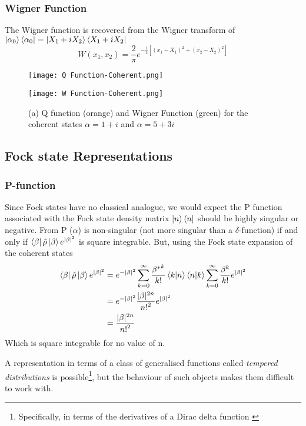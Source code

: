 \subsubsection{Wigner Function}
The Wigner function is recovered from the Wigner transform of $\ket{\alpha_0}\bra{\alpha_0} = \ket{X_1+iX_2}\bra{X_1+iX_2}$
\begin{equation}
	W(x_1, x_2) = \frac{2}{\pi} e^{-\frac{1}{2}[{(x_1-X_1)}^2+{(x_2-X_2)}^2]}
\end{equation}
\begin{figure}[!htb]
  \begin{minipage}{0.5\linewidth}
          \texttt{[image: Q Function-Coherent.png]}
	\end{minipage}%
  \begin{minipage}{0.5\linewidth}
          \texttt{[image: W Function-Coherent.png]}
    \end{minipage}
  \caption{(a) Q function (orange) and Wigner Function (green) for the coherent states $\alpha = 1+i$ and $\alpha = 5+3i$}
\end{figure}
\subsection{Fock state Representations}
\subsubsection{P-function}
Since Fock states have no classical analogue, we would expect the P function associated with the Fock state density matrix $\ket{n}\bra{n}$ should be highly singular or negative.
From \cite{Mehta1967}  P ($\alpha$) is non-singular (not more singular than a $\delta$-function) if and only if $ \bra{\beta} \hat{\rho} \ket{\beta} e^{|\beta|^2} $ is square integrable.
But, using the Fock state expansion of the coherent states
\begin{align}
	 \bra{\beta} \hat{\rho} \ket{\beta} e^{|\beta|^2}  &= e^{-|\beta|^2} \sum_{k=0}^\infty \frac {{\beta^*}^k}{k!} \braket{k}{n}\braket{n}{k} \sum_{k=0}^\infty \frac {\beta^k}{k!}e^{|\beta|^2} \\ &= e^{-|\beta|^2} \frac{|\beta|^{2n}}{{n!}^2} e^{|\beta|^2} \\ &= \frac{|\beta|^{2n}}{{n!}^2}
\end{align}
Which is square integrable for no value of n.

A representation in terms of a class of generalised functions called \emph{tempered distributions} is possible\footnote{Specifically, in terms of the derivatives of a Dirac delta function \cite{Gerry2005}}, but the behaviour of such objects makes them difficult to work with.
